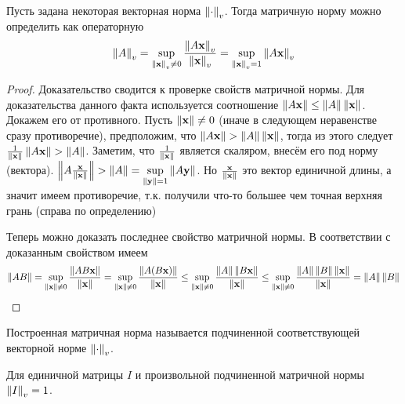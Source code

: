 \begin{lemma}
  Пусть задана некоторая векторная норма $\left\lVert\cdot\right\rVert_v$. Тогда матричную норму можно определить как операторную
  $$
    \left\lVert A\right\rVert_v = \sup_{\left\lVert\mathbf{x}\right\rVert_{v} \neq 0} \frac{\left\lVert A \mathbf{x}\right\rVert_v}{\left\lVert\mathbf{x}\right\rVert_{v}} = \sup_{\left\lVert\mathbf{x}\right\rVert_{v} = 1} \left\lVert A \mathbf{x}\right\rVert_v
  $$
  \begin{proof}
    Доказательство сводится к проверке свойств матричной нормы.
    Для доказательства данного факта используется соотношение $\left\lVert A\mathbf{x}\right\rVert \le \left\lVert A\right\rVert\left\lVert\mathbf{x}\right\rVert$. Докажем его от противного. Пусть $\left\lVert\mathbf{x}\right\rVert \neq 0$ (иначе в следующем неравенстве сразу противоречие), предположим, что $\left\lVert A\mathbf{x}\right\rVert > \left\lVert A\right\rVert\left\lVert\mathbf{x}\right\rVert$, тогда из этого следует $\frac{1}{\left\lVert\mathbf{x}\right\rVert} \left\lVert A\mathbf{x}\right\rVert > \left\lVert A\right\rVert$. Заметим, что $\frac{1}{\left\lVert\mathbf{x}\right\rVert}$ является скаляром, внесём его под норму (вектора). $\left\lVert A \frac{\mathbf{x}}{\left\lVert\mathbf{x}\right\rVert}\right\rVert > \left\lVert A\right\rVert = \sup\limits_{\left\lVert\mathbf{y}\right\rVert = 1} \left\lVert A \mathbf{y}\right\rVert $. Но $\frac{\mathbf{x}}{\left\lVert\mathbf{x}\right\rVert} $ это вектор единичной длины, а значит имеем противоречие, т.к. получили что-то большее чем точная верхняя грань (справа по определению)

    Теперь можно доказать последнее свойство матричной нормы. В соответствии с доказанным свойством имеем
    $$
      \left\lVert AB\right\rVert =
      \sup_{\left\lVert\mathbf{x}\right\rVert \neq 0} \frac{\left\lVert AB \mathbf{x}\right\rVert}{\left\lVert\mathbf{x}\right\rVert} =
      \sup_{\left\lVert\mathbf{x}\right\rVert \neq 0} \frac{\left\lVert A(B\mathbf{x})\right\rVert}{\left\lVert\mathbf{x}\right\rVert} \le
      \sup_{\left\lVert\mathbf{x}\right\rVert \neq 0} \frac{\left\lVert A\right\rVert \left\lVert B\mathbf{x}\right\rVert}{\left\lVert\mathbf{x}\right\rVert} \le
      \sup_{\left\lVert\mathbf{x}\right\rVert \neq 0} \frac{\left\lVert A\right\rVert\left\lVert B\right\rVert \left\lVert\mathbf{x}\right\rVert}{\left\lVert\mathbf{x}\right\rVert} =
      \left\lVert A\right\rVert\left\lVert B\right\rVert
    $$
  \end{proof}
\end{lemma}

\begin{definition}
  Построенная матричная норма называется подчиненной соответствующей векторной норме $\left\lVert\cdot\right\rVert_v$.
\end{definition}

\begin{remark*}
  Для единичной матрицы $I$ и произвольной подчиненной матричной нормы $\left\lVert I\right\rVert_v = 1$.
\end{remark*}

